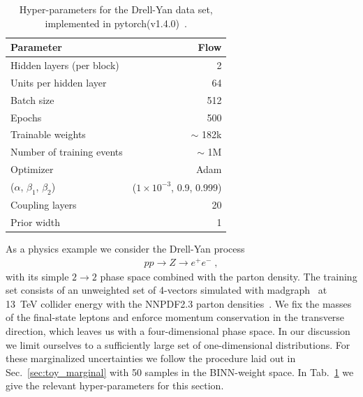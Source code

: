 \begin{table}[b!]
\begin{small} \begin{center}
\begin{tabular}{l r }
\toprule
Parameter & Flow \\
\midrule
Hidden layers (per block) & 2\\
Units per hidden layer & 64\\
Batch size & 512 \\
Epochs & 500 \\
Trainable weights & $\sim$ 182k \\
Number of training events & $\sim$ 1M\\
Optimizer & Adam\\
($\alpha$, $\beta_1$, $\beta_2$)  & ($1\times10^{-3}$, 0.9, 0.999) \\
Coupling layers & 20 \\
Prior width & 1 \\
\bottomrule
\end{tabular}
\end{center} \end{small}
\caption{Hyper-parameters for the Drell-Yan data set, implemented in
  pytorch(v1.4.0)~\cite{pytorch}.}
\label{tab:DY_param_details}
\end{table}

As a physics example we consider the Drell-Yan process
%
\begin{align}
pp \rightarrow Z \rightarrow e^+ e^- \; ,
\end{align}
%
with its simple $2 \to 2$ phase space combined with the parton
density. The training set consists of an unweighted set of 4-vectors
simulated with madgraph~\cite{madgraph} at 13~TeV collider energy
with the NNPDF2.3 parton densities~\cite{Ball:2013hta}. We fix the
masses of the final-state leptons and enforce momentum conservation in
the transverse direction, which leaves us with a four-dimensional
phase space. In our discussion we limit ourselves to a sufficiently
large set of one-dimensional distributions. For these marginalized
uncertainties we follow the procedure laid out in
Sec.~\ref{sec:toy_marginal} with 50 samples in the BINN-weight
space. In Tab.~\ref{tab:DY_param_details} we give the relevant
hyper-parameters for this section.


